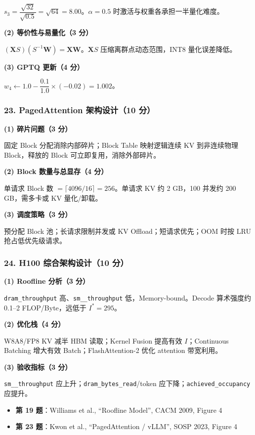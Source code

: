 \documentclass[11pt,a4paper]{article}
\begin{document}
$s_3=\dfrac{\sqrt{32}}{\sqrt{0.5}}=\sqrt{64}=8.00$。$\alpha=0.5$ 时激活与权重各承担一半量化难度。

\noindent\textbf{(2) 等价性与易量化（3 分）}

$(\mathbf{X}S)(S^{-1}\mathbf{W})=\mathbf{XW}$。$\mathbf{X}S$ 压缩离群点动态范围，INT8 量化误差降低。

\noindent\textbf{(3) GPTQ 更新（4 分）}

$w_4\leftarrow 1.0-\dfrac{0.1}{1.0}\times(-0.02)=1.002$。

\subsubsection*{23. PagedAttention 架构设计（10 分）}

\noindent\textbf{(1) 碎片问题（3 分）}

固定 Block 分配消除内部碎片；Block Table 映射逻辑连续 KV 到非连续物理 Block，释放的 Block 可立即复用，消除外部碎片。

\noindent\textbf{(2) Block 数量与总显存（4 分）}

单请求 Block 数 $=\lceil 4096/16\rceil=256$。单请求 KV 约 2 GB，100 并发约 200 GB，需多卡或 KV 量化/卸载。

\noindent\textbf{(3) 调度策略（3 分）}

预分配 Block 池；长请求限制并发或 KV Offload；短请求优先；OOM 时按 LRU 抢占低优先级请求。

\subsubsection*{24. H100 综合架构设计（10 分）}

\noindent\textbf{(1) Roofline 分析（3 分）}

\texttt{dram\_throughput} 高、\texttt{sm\_\_throughput} 低，Memory-bound。Decode 算术强度约 0.1--2 FLOP/Byte，远低于 $I^*=295$。

\noindent\textbf{(2) 优化栈（4 分）}

W8A8/FP8 KV 减半 HBM 读取；Kernel Fusion 提高有效 $I$；Continuous Batching 增大有效 Batch；FlashAttention-2 优化 attention 带宽利用。

\noindent\textbf{(3) 验收指标（3 分）}

\texttt{sm\_\_throughput} 应上升；\texttt{dram\_bytes\_read}/token 应下降；\texttt{achieved\_occupancy} 应提升。

\vspace{0.5cm}
\begin{itemize}[leftmargin=2em,itemsep=0.1em,parsep=0pt,topsep=0pt]
  \item \textbf{第 19 题}：Williams et al., ``Roofline Model'', CACM 2009, Figure 4
  \item \textbf{第 23 题}：Kwon et al., ``PagedAttention / vLLM'', SOSP 2023, Figure 4
\end{itemize}
\end{document}

